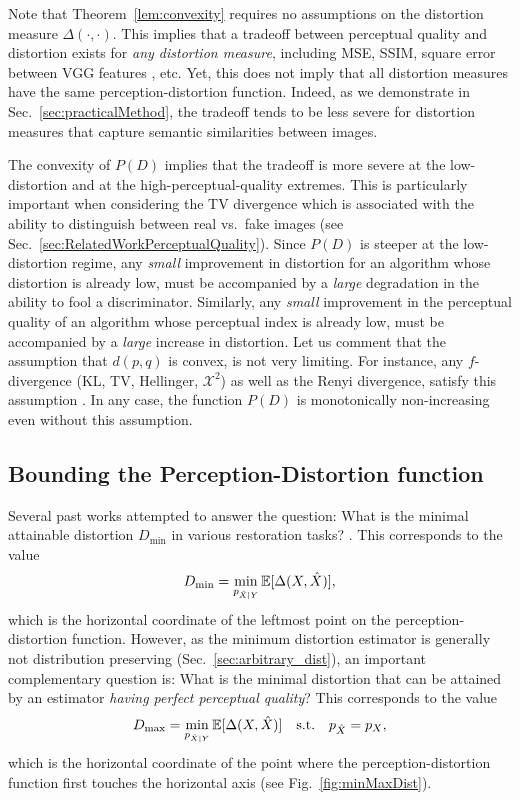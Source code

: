 Note that Theorem~\ref{lem:convexity} requires no assumptions on the distortion measure $\Delta(\cdot,\cdot)$. This implies that a tradeoff between perceptual quality and distortion exists for \emph{any distortion measure}, including \eg MSE, SSIM, square error between VGG features \cite{johnson2016perceptual,ledig2016photo}, etc. Yet, this does not imply that all distortion measures have the same perception-distortion function. Indeed, as we demonstrate in Sec.~\ref{sec:practicalMethod}, the tradeoff tends to be less severe for distortion measures that capture semantic similarities between images.

The convexity of $P(D)$ implies that the tradeoff is more severe at the low-distortion and at the high-perceptual-quality extremes. This is particularly important when considering the TV divergence which is associated with the ability to distinguish between real vs.~fake images (see Sec.~\ref{sec:RelatedWorkPerceptualQuality}). Since $P(D)$ is steeper at the low-distortion regime, any \emph{small} improvement in distortion for an algorithm whose distortion is already low, must be accompanied by a \emph{large} degradation in the ability to fool a discriminator. Similarly, any \emph{small} improvement in the perceptual quality of an algorithm whose perceptual index is already low, must be accompanied by a \emph{large} increase in distortion. Let us comment that the assumption that $d(p,q)$ is convex, is not very limiting. For instance, any $f$-divergence (\eg KL, TV, Hellinger, $\mathcal{X}^2$) as well as the Renyi divergence, satisfy this assumption \cite{csiszar2004information,van2014renyi}. In any case, the function $P(D)$ is monotonically non-increasing even without this assumption.

\subsection{Bounding the Perception-Distortion function}\label{sec:bounding}

Several past works attempted to answer the question: What is the minimal attainable distortion $D_{\min}$ in various restoration tasks? \cite{levin2011natural,levin2012patch,chatterjee2010denoising,chatterjee2011practical,baker2002limits}. This corresponds to the value 
\begin{equation}\label{eq:Dmin}
D_{\min} =  \min_{p_{\hat{X}|Y}} \mathbb{E}[\Delta(X,\hat{X})],
\end{equation}
which is the horizontal coordinate of the leftmost point on the perception-distortion function. However, as the minimum distortion estimator is generally not distribution preserving (Sec.~\ref{sec:arbitrary_dist}), an important complementary question is: What is the minimal distortion that can be attained by an estimator \emph{having perfect perceptual quality}? This corresponds to the value
\begin{equation}\label{eq:Dmax}
D_{\max} =  \min_{p_{\hat{X}|Y}} \mathbb{E}[\Delta(X,\hat{X})] \quad \text{s.t.} \quad p_{\hat{X}} = p_X,
\end{equation}
which is the horizontal coordinate of the point where the perception-distortion function first touches the horizontal axis (see Fig.~\ref{fig:minMaxDist}).

